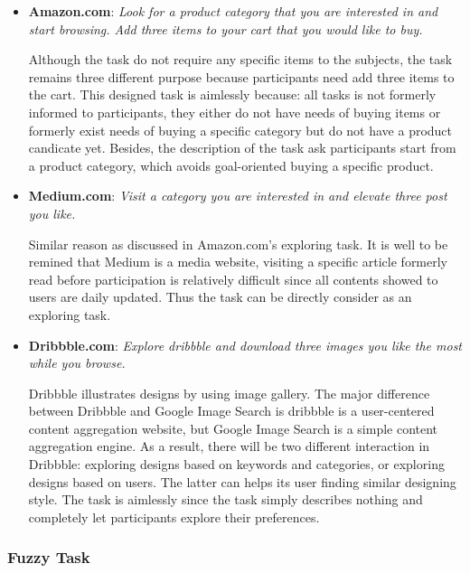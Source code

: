 \begin{itemize}
    \item \textbf{Amazon.com}: \emph{Look for a product category that you are interested in and start browsing. 
        Add three items to your cart that you would like to buy.}

        Although the task do not require any specific items to the subjects, the task remains three different
        purpose because participants need add three items to the cart. This designed task 
        is aimlessly because: all tasks is not formerly informed to participants, 
        they either do not have needs of buying items or 
        formerly exist needs of buying a specific category but do not have a product candicate yet.
        Besides, the description of the task ask participants start from a product category, which avoids 
        goal-oriented buying a specific product.

    \item \textbf{Medium.com}: \emph{Visit a category you are interested in and elevate three post you like.}

        Similar reason as discussed in Amazon.com's exploring task. It is well to be remined that Medium is a media
        website, visiting a specific article formerly read before participation is relatively difficult 
        since all contents showed to users are daily updated. Thus the task can be directly consider as an exploring task.

    \item \textbf{Dribbble.com}: \emph{Explore dribbble and download three images you like the most while you browse.}

        Dribbble illustrates designs by using image gallery. The major difference between Dribbble and Google Image Search
        is dribbble is a user-centered content aggregation website, but Google Image Search is a simple content aggregation engine.
        As a result, there will be two different interaction in Dribbble: exploring designs based on keywords and categories,
        or exploring designs based on users. The latter can helps its user finding similar designing style.
        The task is aimlessly since the task simply describes nothing and completely let participants explore their preferences.

\end{itemize}

\subsubsection{Fuzzy Task}


